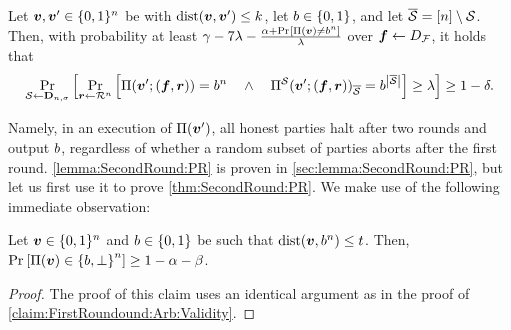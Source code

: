 \begin{lemma}\label{lemma:SecondRound:PR}
Let ${ \boldsymbol{v}},{ \boldsymbol{v}}' \in {\{0,1\}^n}$ be with $\mathrm{dist}({ \boldsymbol{v}},{ \boldsymbol{v}}') \le k$, let $b\in \{0,1\}$, and let ${\overline{\mathcal{S}}} = [n] \setminus {\cal{S}}$.  Then, with probability at least $\gamma- 7\lambda- \frac{\alpha + \Pr_{}\left[\Pi({ \boldsymbol{v}}) \ne b^n\right]}{\lambda}$ over ${ \boldsymbol{f}} \gets D_{\cal F}$, it holds that
\begin{align*}
\Pr_{{\cal{S}} \gets \mathbf{D}_{n,\sigma}}\left[\Pr_{{ \boldsymbol{r}} \gets \mathcal{R}^n}\left[\Pi({ \boldsymbol{v}}';({ \boldsymbol{f}},{ \boldsymbol{r}})) = b^n \quad \land \quad \Pi^{\cal{S}}({ \boldsymbol{v}}';({ \boldsymbol{f}},{ \boldsymbol{r}}))_{\overline{\mathcal{S}}} = b^{\left|{\overline{\mathcal{S}}}\right|} \right] \ge \lambda\right]\ge 1-\delta.
\end{align*}
\end{lemma}
Namely, in an execution of $\Pi({ \boldsymbol{v}}')$, all honest parties halt after two rounds and output $b$, regardless of whether a random subset of parties aborts after the first round. \cref{lemma:SecondRound:PR} is proven in \cref{sec:lemma:SecondRound:PR}, but let us first use it to prove \cref{thm:SecondRound:PR}. We make use of the following immediate observation:
\begin{claim}\label{claim:SecondRound:PR:Validity}
Let ${ \boldsymbol{v}} \in {\{0,1\}^n}$ and $b \in \{0,1\}$ be such that $\mathrm{dist}({ \boldsymbol{v}},b^n) \le t$. Then, $\Pr_{}\left[\Pi({ \boldsymbol{v}}) \in \left\{b,\perp\right\}^n \right] \ge 1 - \alpha - \beta $.
\end{claim}
\begin{proof}
The proof of this claim uses an identical argument as in the proof of \cref{claim:FirstRoundound:Arb:Validity}.	
\end{proof}



